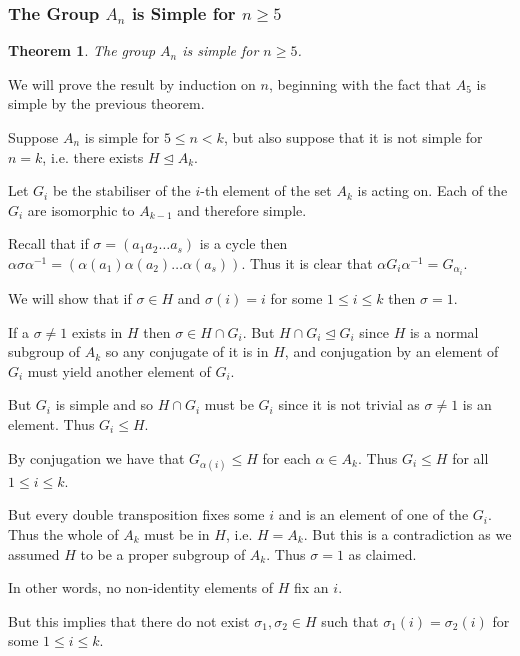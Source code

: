 \documentclass[10pt]{article}
\newtheorem{theorem}{Theorem}[section]
\newenvironment{proof}[1][Proof]{\begin{trivlist}
\item[\hskip \labelsep {\itshape #1}]}{\end{trivlist}}
\begin{document}
\subsubsection{The Group $A_n$ is Simple for $n \geq 5$}

\begin{theorem}
The group $A_n$ is simple for $n \geq 5$.
\end{theorem}

\begin{proof}
We will prove the result by induction on $n$, beginning with the fact that $A_5$ is simple by the previous theorem.

Suppose $A_n$ is simple for $5 \leq n < k$, but also suppose that it is not simple for $n = k$, i.e. there exists $H \mathrel{\unlhd} A_k$.

Let $G_i$ be the stabiliser of the $i$-th element of the set $A_k$ is acting on. Each of the $G_i$ are isomorphic to $A_{k-1}$ and therefore simple.

Recall that if $\sigma = (a_1 a_2 \ldots a_s)$ is a cycle then $\alpha\sigma\alpha^{-1} = (\alpha(a_1) \alpha(a_2) \ldots \alpha(a_s))$. Thus it is clear that $\alpha G_i \alpha^{-1} = G_{\alpha_i}$.

We will show that if $\sigma \in H$ and $\sigma(i) = i$ for some $1 \leq i \leq k$ then $\sigma = 1$.

If a $\sigma \neq 1$ exists in $H$ then $\sigma \in H\cap G_i$. But $H\cap G_i \mathrel{\unlhd} G_i$ since $H$ is a normal subgroup of $A_k$ so any conjugate of it is in $H$, and conjugation by an element of $G_i$ must yield another element of $G_i$.

But $G_i$ is simple and so $H\cap G_i$ must be $G_i$ since it is not trivial as $\sigma \neq 1$ is an element. Thus $G_i \leq H$.

By conjugation we have that $G_{\alpha(i)} \leq H$ for each $\alpha \in A_k$. Thus $G_i \leq H$ for all $1 \leq i \leq k$.

But every double transposition fixes some $i$ and is an element of one of the $G_i$. Thus the whole of $A_k$ must be in $H$, i.e. $H = A_k$. But this is a contradiction as we assumed $H$ to be a proper subgroup of $A_k$. Thus $\sigma = 1$ as claimed.

In other words, no non-identity elements of $H$ fix an $i$.

But this implies that there do not exist $\sigma_1, \sigma_2 \in H$ such that $\sigma_1(i) = \sigma_2(i)$ for some $1 \leq i \leq k$.


\end{proof}
\end{document}
